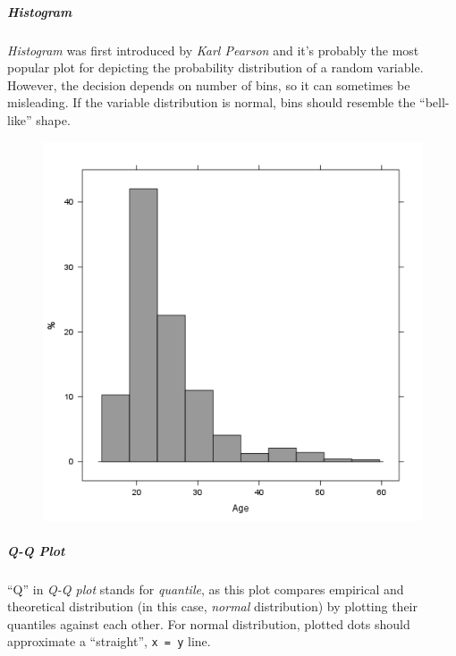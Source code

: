 \documentclass[]{article}
\makeatletter
\def\maxwidth{\ifdim\Gin@nat@width>\linewidth\linewidth
\else\Gin@nat@width\fi}
\let\Oldincludegraphics\includegraphics
\renewcommand{\includegraphics}[1]{\Oldincludegraphics[width=\maxwidth]{#1}}
\makeatother
\begin{document}
\subparagraph{Histogram}

\emph{Histogram} was first introduced by \emph{Karl Pearson} and it's
probably the most popular plot for depicting the probability
distribution of a random variable. However, the decision depends on
number of bins, so it can sometimes be misleading. If the variable
distribution is normal, bins should resemble the ``bell-like'' shape.

\begin{figure}[htbp]
\centering
\includegraphics{ac5d789145bdef09b10219ef16429f53.png}
\caption{}
\end{figure}

\subparagraph{Q-Q Plot}

``Q'' in \emph{Q-Q plot} stands for \emph{quantile}, as this plot
compares empirical and theoretical distribution (in this case,
\emph{normal} distribution) by plotting their quantiles against each
other. For normal distribution, plotted dots should approximate a
``straight'', \texttt{x = y} line.
\end{document}

